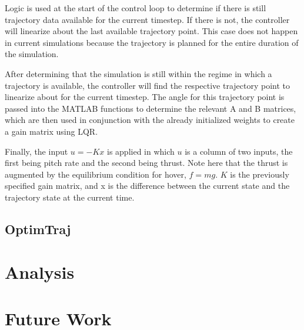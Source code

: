 \documentclass[12pt]{article}
\begin{document}
Logic is used at the start of the control loop to determine if there is still trajectory data available for the current timestep.  If there is not, the controller will linearize about the last available trajectory point.  This case does not happen in current simulations because the trajectory is planned for the entire duration of the simulation.

After determining that the simulation is still within the regime in which a trajectory is available, the controller will find the respective trajectory point to linearize about for the current timestep.  The angle for this trajectory point is passed into the MATLAB functions to determine the relevant A and B matrices, which are then used in conjunction with the already initialized weights to create a gain matrix using LQR.

Finally, the input $u = -Kx$ is applied in which $u$ is a column of two inputs, the first being pitch rate and the second being thrust.  Note here that the thrust is augmented by the equilibrium condition for hover, $f = mg$.  $K$ is the previously specified gain matrix, and x is the difference between the current state and the trajectory state at the current time.

\subsection{OptimTraj}
\section{Analysis}
\section{Future Work}



\end{document}
